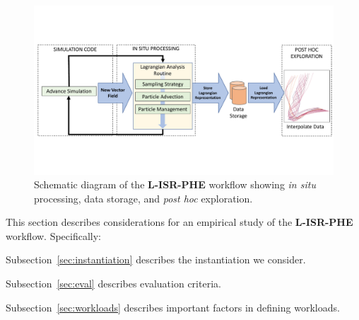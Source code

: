 \begin{figure}
\centering
\includegraphics[width=\linewidth,trim={0cm 4.3cm 0cm 4.3cm}, clip ]{images/Schematic.pdf}
\vspace{-6mm}
\caption{Schematic diagram of the \textbf{L-ISR-PHE} workflow showing \textit{in situ} processing, data storage, and \textit{post hoc} exploration.}
\label{fig:schematic}
\vspace{-6mm}
\end{figure}

This section describes considerations for an empirical study of the \textbf{L-ISR-PHE} workflow.
%
Specifically: 
\begin{tightItemize}
\item Subsection~\ref{sec:instantiation} describes the instantiation we consider. 
\item Subsection~\ref{sec:eval} describes evaluation criteria.
\item Subsection~\ref{sec:workloads} describes important factors in defining workloads.
\end{tightItemize}

%
%
%




%
%

